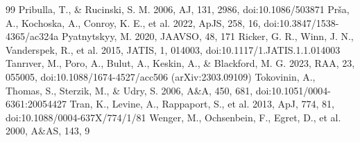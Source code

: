\documentclass{aa}
\begin{document}
\begin{thebibliography}{99}
 Pribulla, T., \& Rucinski, S. M. 2006, AJ, 131, 2986, doi:10.1086/503871
 Prša, A., Kochoska, A., Conroy, K. E., et al. 2022, ApJS, 258, 16, doi:10.3847/1538-4365/ac324a
 Pyatnytskyy, M. 2020, JAAVSO, 48, 171
 Ricker, G. R., Winn, J. N., Vanderspek, R., et al. 2015, JATIS, 1, 014003, doi:10.1117/1.JATIS.1.1.014003
 Tanrıver, M., Poro, A., Bulut, A., Keskin, A., \& Blackford, M. G. 2023, RAA, 23, 055005, doi:10.1088/1674-4527/acc506 (arXiv:2303.09109)
 Tokovinin, A., Thomas, S., Sterzik, M., \& Udry, S. 2006, A\&A, 450, 681, doi:10.1051/0004-6361:20054427
 Tran, K., Levine, A., Rappaport, S., et al. 2013, ApJ, 774, 81, doi:10.1088/0004-637X/774/1/81
 Wenger, M., Ochsenbein, F., Egret, D., et al. 2000, A\&AS, 143, 9
\end{thebibliography}
\end{document}
